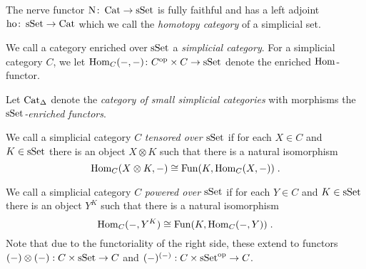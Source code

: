 \begin{lemma}
    The nerve functor $\operatorname{N}\colon\operatorname{Cat}\to\operatorname{sSet}$ is fully faithful and has a left adjoint $\operatorname{ho}\colon\operatorname{sSet}\to\operatorname{Cat}$ which we call the \emph{homotopy category} of a simplicial set.
    \begin{reference}
        \cite[Proposition 1.2.2.1]{kerodon}
    \end{reference}
\end{lemma}
\begin{definition}
    We call a category enriched over $\operatorname{sSet}$ a \emph{simplicial category}.
    For a simplicial category $C$, we let $\operatorname{Hom}_C(-,-)\colon C^{\operatorname{op}}\times C\to\operatorname{sSet}$ denote the enriched $\operatorname{Hom}$-functor.
   
    Let $\operatorname{Cat}_{\Delta}$ denote the \emph{category of small simplicial categories} with morphisms the \emph{$\operatorname{sSet}$-enriched functors}.%
    
    We call a simplicial category $C$ \emph{tensored over $\operatorname{sSet}$} if for each $X\in C$ and $K\in\operatorname{sSet}$ there is an object $X\otimes K$ such that there is a natural isomorphism
    \begin{equation*}
        \operatorname{Hom}_C(X\otimes K,-)\cong\operatorname{Fun}(K,\operatorname{Hom}_C(X,-))\;.
    \end{equation*}

    We call a simplicial category $C$ \emph{powered over $\operatorname{sSet}$} if for each $Y\in C$ and $K\in\operatorname{sSet}$ there is an object $Y^K$ such that there is a natural isomorphism
    \begin{equation*}
        \operatorname{Hom}_C(-,Y^K)\cong\operatorname{Fun}(K,\operatorname{Hom}_C(-,Y))\;.
    \end{equation*}
    Note that due to the functoriality of the right side, these extend to functors $(-)\otimes(-):C\times\operatorname{sSet}\to C$ and $(-)^{(-)}:C\times\operatorname{sSet}^{\operatorname{op}}\to C$.
\end{definition}
